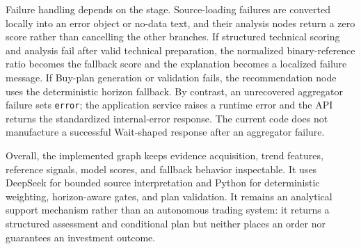 Failure handling depends on the stage. Source-loading failures are converted locally into an error object or no-data text, and their analysis nodes return a zero score rather than cancelling the other branches. If structured technical scoring and analysis fail after valid technical preparation, the normalized binary-reference ratio becomes the fallback score and the explanation becomes a localized failure message. If Buy-plan generation or validation fails, the recommendation node uses the deterministic horizon fallback. By contrast, an unrecovered aggregator failure sets \texttt{error}; the application service raises a runtime error and the API returns the standardized internal-error response. The current code does not manufacture a successful Wait-shaped response after an aggregator failure.

Overall, the implemented graph keeps evidence acquisition, trend features, reference signals, model scores, and fallback behavior inspectable. It uses DeepSeek for bounded source interpretation and Python for deterministic weighting, horizon-aware gates, and plan validation. It remains an analytical support mechanism rather than an autonomous trading system: it returns a structured assessment and conditional plan but neither places an order nor guarantees an investment outcome.
